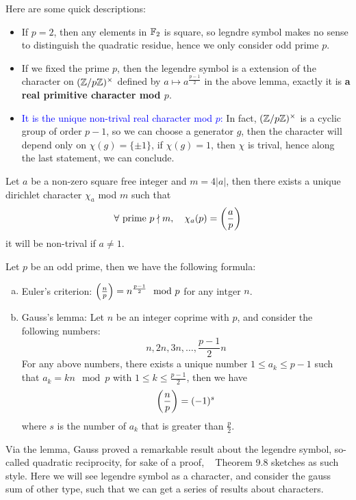 Here are some quick descriptions:

\begin{itemize}
    \item If \(p = 2\), then any elements in \(\mathbb{F}_2\) is square, so legndre symbol makes no sense to distinguish the quadratic residue, hence we only consider odd prime \(p\).

    \item If we fixed the prime \(p\), then the legendre symbol is a extension of the character on \((\mathbb{Z}/p\mathbb{Z})^\times\) defined by \(a \mapsto a^{\frac{p-1}{2}}\) in the above lemma, exactly it is \textbf{a real primitive character mod \(p\)}.
    
    \item \textcolor{blue}{It is the unique non-trival real character mod \(p\):} In fact, \((\mathbb{Z}/p\mathbb{Z})^\times\) is a cyclic group of order \(p-1\), so we can choose a generator \(g\), then the character will depend only on \(\chi(g) = \{\pm 1\}\), if \(\chi(g) = 1\), then \(\chi\) is trival, hence along the last statement, we can conclude.
\end{itemize} 

\begin{proposition}
    Let \(a\) be a non-zero square free integer and \(m = 4|a|\), then there exists a unique dirichlet character \(\chi_a\) mod \(m\) such that 
    \[\forall \text{ prime } p \nmid m, \quad \chi_a(p) = \left(\frac{a}{p}\right)\]
    it will be non-trival if \(a \neq 1\).
\end{proposition}

\begin{proposition}
Let \(p\) be an odd prime, then we have the following formula:
\begin{enumerate}[(a)]
    \item Euler's criterion: \(\left(\frac{n}{p}\right) = n^{\frac{p-1}{2}} \mod p\) for any intger \(n\).
    \item Gauss's lemma: Let \(n\) be an integer coprime with \(p\), and consider the following numbers:
    \[n,2n,3n,\dots, \frac{p-1}{2}n\]
    For any above numbers, there exists a unique number \(1 \leq a_k \leq p-1\) such that \(a_k = kn \mod p\) with \(1 \leq k \leq \frac{p-1}{2}\), then we have
    \[\left(\frac{n}{p}\right) = (-1)^s\]
    where \(s\) is the number of \(a_k\) that is greater than \(\frac{p}{2}\).
\end{enumerate}

\end{proposition}


Via the lemma, Gauss proved a remarkable result about the legendre symbol, so-called quadratic reciprocity, for sake of a proof, ~\cite{Apostol} Theorem 9.8 sketches as such style. Here we will see legendre symbol as a character, and consider the gauss sum of other type, such that we can get a series of results about characters.

